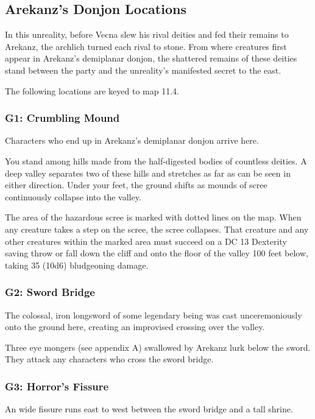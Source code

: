 \documentclass[10pt,a4paper,twoside,bg=print,twocolumn,openany,nodeprecatedcode]{dndbook}
\begin{document}
\subsection{Arekanz's Donjon Locations}
In this unreality, before Vecna slew his rival deities and fed their remains to Arekanz, the archlich turned each rival to stone. From where creatures first appear in Arekanz's demiplanar donjon, the shattered remains of these deities stand between the party and the unreality's manifested secret to the east.

The following locations are keyed to map 11.4.

\subsubsection{G1: Crumbling Mound}
Characters who end up in Arekanz's demiplanar donjon arrive here.

\begin{DndReadAloud}{}
You stand among hills made from the half-digested bodies of countless deities. A deep valley separates two of these hills and stretches as far as can be seen in either direction. Under your feet, the ground shifts as mounds of scree continuously collapse into the valley.

\end{DndReadAloud}

The area of the hazardous scree is marked with dotted lines on the map. When any creature takes a step on the scree, the scree collapses. That creature and any other creatures within the marked area must succeed on a DC 13 Dexterity saving throw or fall down the cliff and onto the floor of the valley 100 feet below, taking 35 (10d6) bludgeoning damage.

\subsubsection{G2: Sword Bridge}
\begin{DndReadAloud}{}
The colossal, iron longsword of some legendary being was cast unceremoniously onto the ground here, creating an improvised crossing over the valley.

\end{DndReadAloud}

Three eye mongers (see appendix A) swallowed by Arekanz lurk below the sword. They attack any characters who cross the sword bridge.

\subsubsection{G3: Horror's Fissure}
\begin{DndReadAloud}{}
An wide fissure runs east to west between the sword bridge and a tall shrine.

\end{DndReadAloud}
\end{document}
